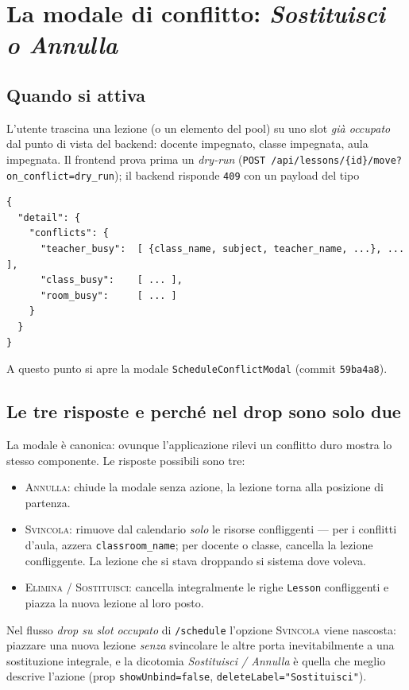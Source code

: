 \section{La modale di conflitto: \emph{Sostituisci o Annulla}}
\label{sec:conflict-modal}

\subsection{Quando si attiva}

L'utente trascina una lezione (o un elemento del pool) su uno
slot \emph{gi\`a occupato} dal punto di vista del backend:
docente impegnato, classe impegnata, aula impegnata. Il
frontend prova prima un \emph{dry-run} (\texttt{POST
/api/lessons/\{id\}/move?on\_conflict=dry\_run}); il backend
risponde \texttt{409} con un payload del tipo
\begin{lstlisting}[basicstyle=\ttfamily\footnotesize]
{
  "detail": {
    "conflicts": {
      "teacher_busy":  [ {class_name, subject, teacher_name, ...}, ... ],
      "class_busy":    [ ... ],
      "room_busy":     [ ... ]
    }
  }
}
\end{lstlisting}
A questo punto si apre la modale \texttt{ScheduleConflictModal}
(commit \texttt{59ba4a8}).

\subsection{Le tre risposte e perch\'e nel drop sono solo due}

La modale \`e canonica: ovunque l'applicazione rilevi un
conflitto duro mostra lo stesso componente. Le risposte
possibili sono tre:
\begin{itemize}
  \item \textsc{Annulla}: chiude la modale senza azione, la
    lezione torna alla posizione di partenza.
  \item \textsc{Svincola}: rimuove dal calendario \emph{solo}
    le risorse confliggenti --- per i conflitti d'aula,
    azzera \texttt{classroom\_name}; per docente o classe,
    cancella la lezione confliggente. La lezione che si stava
    droppando si sistema dove voleva.
  \item \textsc{Elimina} / \textsc{Sostituisci}: cancella
    integralmente le righe \texttt{Lesson} confliggenti e
    piazza la nuova lezione al loro posto.
\end{itemize}
Nel flusso \emph{drop su slot occupato} di \texttt{/schedule}
l'opzione \textsc{Svincola} viene nascosta: piazzare una nuova
lezione \emph{senza} svincolare le altre porta inevitabilmente a
una sostituzione integrale, e la dicotomia \emph{Sostituisci /
Annulla} \`e quella che meglio descrive l'azione (prop
\texttt{showUnbind=false}, \texttt{deleteLabel="Sostituisci"}).

